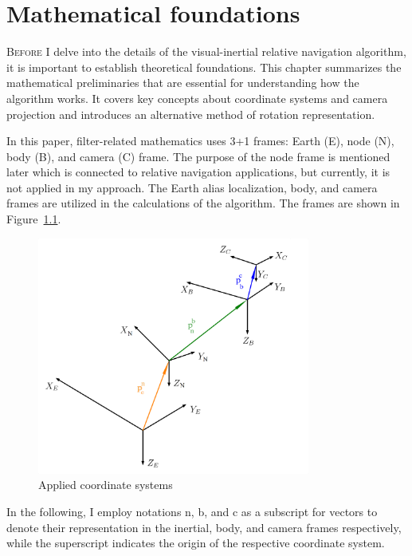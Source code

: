 \chapter{Mathematical foundations}\label{chap:math}

\lettrine{B}{efore} I delve into the details of the visual-inertial relative navigation algorithm, it is important to establish theoretical foundations. This chapter summarizes the mathematical preliminaries that are essential for understanding how the algorithm works. It covers key concepts about coordinate systems and camera projection and introduces an alternative method of rotation representation. 

In this paper, filter-related mathematics uses 3+1 frames: Earth (E), node (N), body (B), and camera (C) frame. The purpose of the node frame is mentioned later which is connected to relative navigation applications, but currently, it is not applied in my approach. The Earth alias localization, body, and camera frames are utilized in the calculations of the algorithm. The frames are shown in Figure~\ref{fig:coord-sys}. 

\begin{figure}[!ht]
    \centering
    \includegraphics[width=0.8\textwidth]{figures/Coord_sys.png}
    \caption{Applied coordinate systems}\label{fig:coord-sys}
\end{figure}

In the following, I employ notations n, b, and c as a subscript for vectors to denote their representation in the inertial, body, and camera frames respectively, while the superscript indicates the origin of the respective coordinate system.

